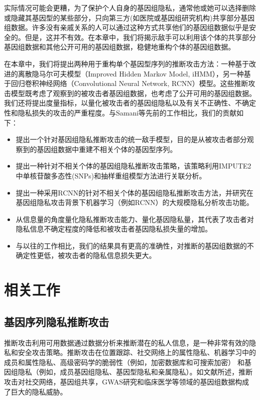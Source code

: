 实际情况可能会更糟，为了保护个人自身的基因组隐私，通常他或她可以选择删除或隐藏其基因型的某些部分\cite{shi2017overview}，只向第三方(如医院或基因组研究机构)共享部分基因组数据。许多没有亲戚关系的人可以通过这种方式共享他们的基因组数据似乎是安全的。但是，这并不有效。在本章中，我们将揭示敌手可以利用该个体的共享部分基因组数据和其他公开可用的基因组数据，稳健地重构个体的基因组数据。

在本章中，我们将提出两种用于重构单个基因型序列的推断攻击方法：一种基于改进的离散隐马尔可夫模型（Improved Hidden Markov Model, iHMM），另一种基于回归卷积神经网络（Convolutional Neural Network, RCNN）模型。这些推断攻击模型既考虑了观察到的被攻击者基因组数据，也考虑了公开可用的基因组数据。我们还将提出度量指标，以量化被攻击者的基因组隐私以及有关不正确性、不确定性和隐私损失的攻击的严重程度。与Samani等\cite{samani2015quantifying}先前的工作相比，我们的贡献如下：
\begin{itemize}
	\item 提出一个针对基因组隐私推断攻击的统一敌手模型，目的是从被攻击者部分观察到的基因组数据中重建不相关个体的基因型序列。
	\item 提出一种针对不相关个体的基因组隐私推断攻击策略，该策略利用IMPUTE2\cite{howie2009flexible}中单核苷酸多态性(SNPs)和抽样重组模型方法进行关联分析。
	\item 提出一种采用RCNN的针对不相关个体的基因组隐私推断攻击方法，并研究在基因组隐私攻击背景下机器学习（例如RCNN）的大规模隐私分析攻击功能。
	\item 从信息量的角度量化隐私推断攻击能力、量化基因隐私量，其代表了攻击者对隐私信息不确定程度的降低和被攻击者基因隐私损失量的增加。
	\item 与以往的工作相比，我们的结果具有更高的准确性，对推断的基因组数据的不确定性更低，被攻击者的隐私信息损失更大。
\end{itemize}

\section{相关工作}\label{sec:relat}
\subsection{基因序列隐私推断攻击}

推断攻击利用可用数据通过数据分析来推断潜在的私人信息\cite{en2018inference}，是一种非常有效的隐私和安全攻击策略。推断攻击在位置跟踪\cite{narain2016inferring}、社交网络上的属性隐私\cite{gong2016you}、机器学习中的成员和属性隐私\cite{shokri2017membership,ganju2018property}、高级密码学的脆弱性（例如，加密数据库和可搜索加密）\cite{pouliot2016shadow} 和基因组隐私（例如，成员基因组隐私\cite{wang2009learning}、基因型隐私\cite{samani2015quantifying,he2017addressing}和亲属隐私\cite{humbert2013addressing}）。如文献\cite{ayday2017inference}所述，推断攻击对社交网络，基因组共享，GWAS研究和临床医学等领域的基因组数据构成了巨大的隐私威胁。

